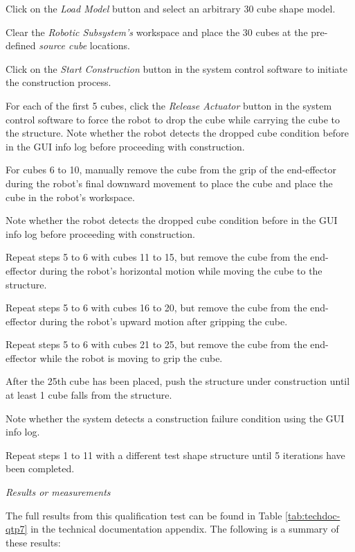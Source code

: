 \begin{compactenum}
	\item Click on the \textit{Load Model} button and select an arbitrary 30 cube shape model.
	\item Clear the \textit{Robotic Subsystem's} workspace and place the 30 cubes at the pre-defined \textit{source cube} locations.
	\item Click on the \textit{Start Construction} button in the system control software to initiate the construction process.
	\item For each of the first 5 cubes, click the \textit{Release Actuator} button in the system control software to force the robot to drop the cube while carrying the cube to the structure. Note whether the robot detects the dropped cube condition before in the GUI info log before proceeding with construction.
	\item For cubes 6 to 10, manually remove the cube from the grip of the end-effector during the robot's final downward movement to place the cube and place the cube in the robot's workspace.
	\item Note whether the robot detects the dropped cube condition before in the GUI info log before proceeding with construction.
	\item Repeat steps 5 to 6 with cubes 11 to 15, but remove the cube from the end-effector during the robot's horizontal motion while moving the cube to the structure.
	\item Repeat steps 5 to 6 with cubes 16 to 20, but remove the cube from the end-effector during the robot's upward motion after gripping the cube.
	\item Repeat steps 5 to 6 with cubes 21 to 25, but remove the cube from the end-effector while the robot is moving to grip the cube.
	\item After the 25th cube has been placed, push the structure under construction until at least 1 cube falls from the structure.
	\item Note whether the system detects a construction failure condition using the GUI info log.
	\item Repeat steps 1 to 11 with a different test shape structure until 5 iterations have been completed.
\end{compactenum}

\textit{Results or measurements}

The full results from this qualification test can be found in Table \ref{tab:techdoc-qtp7} in the technical documentation appendix. The following is a summary of these results:

